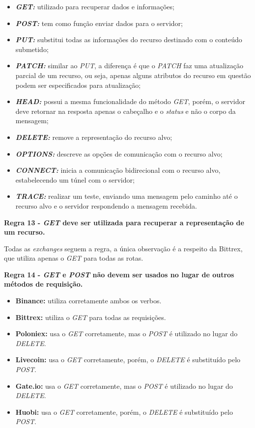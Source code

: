 \begin{itemize}
    \item \textit{\textbf{GET:}} utilizado para recuperar dados e informações;
    \item \textit{\textbf{POST:}} tem como função enviar dados para o servidor;
    \item \textit{\textbf{PUT:}} substitui todas as informações do recurso destinado com o conteúdo submetido;
    \item \textit{\textbf{PATCH:}} similar ao \textit{PUT}, a diferença é que o \textit{PATCH} faz uma atualização parcial de um recurso, ou seja, apenas alguns atributos do recurso em questão podem ser especificados para atualização;
    \item \textit{\textbf{HEAD:}} possui a mesma funcionalidade do método \textit{GET}, porém, o servidor deve retornar na resposta apenas o cabeçalho e o \textit{status} e não o corpo da mensagem;
    \item \textit{\textbf{DELETE:}} remove a representação do recurso alvo;
    \item \textit{\textbf{OPTIONS:}} descreve as opções de comunicação com o recurso alvo;
    \item \textit{\textbf{CONNECT:}} inicia a comunicação bidirecional com o recurso alvo, estabelecendo um túnel com o servidor;
    \item \textit{\textbf{TRACE:}} realizar um teste, enviando uma mensagem pelo caminho até o recurso alvo e o servidor respondendo a mensagem recebida.
\end{itemize}

\textbf{Regra 13 - \textit{GET} deve ser utilizada para recuperar a representação de um recurso.}

Todas as \textit{exchanges} seguem a regra, a única observação é a respeito da Bittrex, que utiliza apenas o \textit{GET} para todas as rotas.

\textbf{Regra 14 - \textit{GET} e \textit{POST} não devem ser usados no lugar de outros métodos de requisição.}

\begin{itemize}
    \item \textbf{Binance:} utiliza corretamente ambos os verbos.
    \item \textbf{Bittrex:} utiliza o \textit{GET} para todas as requisições.
    \item \textbf{Poloniex:} usa o \textit{GET} corretamente, mas o \textit{POST} é utilizado no lugar do \textit{DELETE}.
    \item \textbf{Livecoin:} usa o \textit{GET} corretamente, porém, o \textit{DELETE} é substituído pelo \textit{POST}.
    \item \textbf{Gate.io:} usa o \textit{GET} corretamente, mas o \textit{POST} é utilizado no lugar do \textit{DELETE}.
    \item \textbf{Huobi:} usa o \textit{GET} corretamente, porém, o \textit{DELETE} é substituído pelo \textit{POST}.
\end{itemize}

